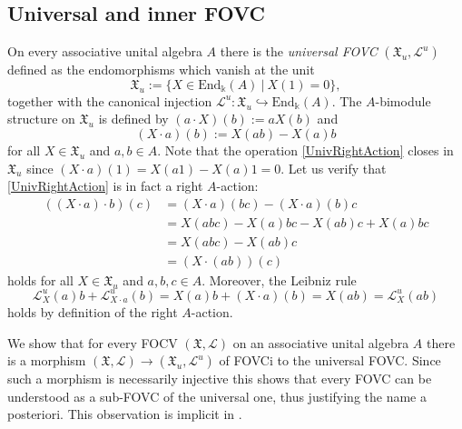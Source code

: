 \documentclass{article}
\theoremstyle{definition}
\begin{document}
	\subsection{Universal 
		and inner FOVC}\label{sec:univ}
	On every associative unital algebra $A$ there is the \textit{universal FOVC} $(\mathfrak{X}_u,\mathscr{L}^u)$ defined as the endomorphisms which vanish at the unit
	\begin{equation}
		\mathfrak{X}_u:=\{X\in\mathrm{End}_\Bbbk(A)~|~X(1)=0\},
	\end{equation}
	together with the canonical injection $\mathscr{L}^u\colon\mathfrak{X}_u\hookrightarrow\mathrm{End}_\Bbbk(A)$. The $A$-bimodule structure on $\mathfrak{X}_u$ is defined by $(a\cdot X)(b):=aX(b)$ and
	\begin{equation}\label{UnivRightAction}
		(X\cdot a)(b):=X(ab)-X(a)b
	\end{equation}
	for all $X\in\mathfrak{X}_u$ and $a,b\in A$. Note that the operation \eqref{UnivRightAction} closes in $\mathfrak{X}_u$ since $(X\cdot a)(1)=X(a1)-X(a)1=0$. Let us verify that \eqref{UnivRightAction} is in fact a right $A$-action:
	\begin{align*}
		((X\cdot a)\cdot b)(c)
		&=(X\cdot a)(bc)-(X\cdot a)(b)c\\
		&=X(abc)-X(a)bc-X(ab)c+X(a)bc\\
		&=X(abc)-X(ab)c\\
		&=(X\cdot(ab))(c)
	\end{align*}
	holds for all $X\in\mathfrak{X}_u$ and $a,b,c\in A$. Moreover, the Leibniz rule
	$$
	\mathscr{L}^u_X(a)b+\mathscr{L}^u_{X\cdot a}(b)
	=X(a)b+(X\cdot a)(b)
	=X(ab)
	=\mathscr{L}^u_X(ab)
	$$
	holds by definition of the right $A$-action.
	
	We show that for every FOCV $(\mathfrak{X},\mathscr{L})$ on an associative unital algebra $A$ there is a morphism $(\mathfrak{X},\mathscr{L})\to(\mathfrak{X}_u,\mathscr{L}^u)$ of FOVCi to the universal FOVC.
	Since such a morphism is necessarily injective this shows that every FOVC can be understood as a sub-FOVC of the universal one, thus justifying the name a posteriori. This observation is implicit in \cite[Section 4]{Bor23}.
	
\end{document}
